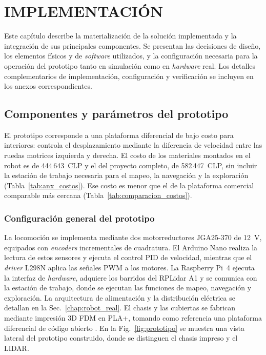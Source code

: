 \chapter{IMPLEMENTACIÓN}
\label{ch:implementacion}

Este capítulo describe la materialización de la solución implementada y la
integración de sus principales componentes. Se presentan las decisiones de
diseño, los elementos físicos y de \textit{software} utilizados, y la configuración
necesaria para la operación del prototipo tanto en simulación como en \textit{hardware} real. Los detalles complementarios de implementación, configuración y verificación se incluyen en los anexos correspondientes.

\section{Componentes y parámetros del prototipo}
\label{ch:componentes}

El prototipo corresponde a una plataforma diferencial de bajo costo para interiores: controla el desplazamiento mediante la diferencia de velocidad entre las ruedas motrices izquierda y derecha. El costo de los materiales montados en el robot es de 444\,643~CLP y el del proyecto completo, de 582\,447~CLP, sin incluir la estación de trabajo necesaria para el mapeo, la navegación y la exploración (Tabla~\ref{tab:anx_costos}). Ese costo es menor que el de la plataforma comercial comparable más cercana (Tabla~\ref{tab:comparacion_costos}).

\subsection{Configuración general del prototipo}

La locomoción se implementa mediante dos motorreductores JGA25-370 de 12~V,
equipados con \textit{encoders} incrementales de cuadratura. El \gls{Arduino} Nano
realiza la lectura de estos sensores y ejecuta el control PID de velocidad,
mientras que el \textit{driver} L298N aplica las señales \gls{PWM} a los motores. La
Raspberry Pi~4 ejecuta la interfaz de \textit{hardware}, adquiere los barridos del
RPLidar A1 y se comunica con la estación de trabajo, donde se ejecutan las
funciones de mapeo, navegación y exploración.
La arquitectura de alimentación y la distribución eléctrica se detallan en
la Sec.~\ref{chap:robot_real}. El chasis y las cubiertas se fabrican
mediante impresión 3D FDM en PLA+, tomando como referencia una plataforma
diferencial de código abierto
\citep{marcuslanzoni2020vacuum}.
En la Fig.~\ref{fig:prototipo} se muestra una vista lateral del prototipo
construido, donde se distinguen el chasis impreso y el LIDAR.

